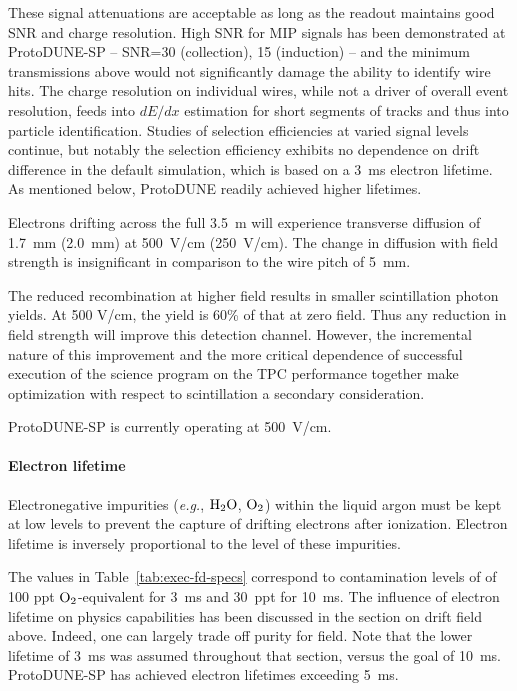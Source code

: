 These signal attenuations are acceptable as long as the readout 
maintains good SNR and charge resolution.  High SNR for 
MIP signals has been demonstrated at ProtoDUNE-SP -- SNR=30 
(collection), 15 (induction) -- and the minimum transmissions 
above would not significantly damage the ability to identify 
wire hits.  The charge resolution on individual wires, while not 
a driver of overall event resolution, feeds into $dE/dx$ 
estimation for short segments of tracks and thus into 
particle identification.  Studies of selection efficiencies at 
varied signal levels continue, but notably the \nue 
selection efficiency exhibits no dependence on drift 
difference in the default simulation, which is based on a 
3~ms electron lifetime.  As mentioned below, ProtoDUNE readily 
achieved higher lifetimes.

Electrons drifting across the full 3.5~m will experience 
transverse diffusion of 1.7~mm (2.0~mm) at 500~V/cm (250~V/cm).  
The change in diffusion with field strength is insignificant in comparison to the wire pitch of 5~mm.

The reduced recombination at higher field results in 
smaller scintillation photon yields.  At 500 V/cm, the 
yield is 60\% of that at zero field.  Thus any reduction 
in field strength will improve this detection channel.  
However, the incremental nature of this improvement and 
the more critical dependence of successful execution of 
the science program on the TPC performance together make
optimization with respect to scintillation a secondary consideration.

ProtoDUNE-SP is currently operating at 500~V/cm.

\paragraph{Electron lifetime}
Electronegative impurities ({\em e.g.}, $\rm{H}_{2}\rm{O}$, $\rm{O}_{2}$) within the liquid argon must be kept at 
low levels to prevent the capture of drifting electrons after ionization.  Electron lifetime is inversely proportional to the level of these impurities.

The values in Table~\ref{tab:exec-fd-specs} correspond to 
contamination levels of of 100 ppt $\rm{O}_2$-equivalent 
for 3~ms and 30~ppt for 10~ms.  The influence of electron 
lifetime on physics capabilities has been discussed in the 
section on drift field above.  
Indeed, one can largely trade off purity for field. 
Note that the lower lifetime of 3~ms was assumed throughout 
that section, versus the goal of 10~ms.  ProtoDUNE-SP has achieved electron lifetimes exceeding 5~ms.


